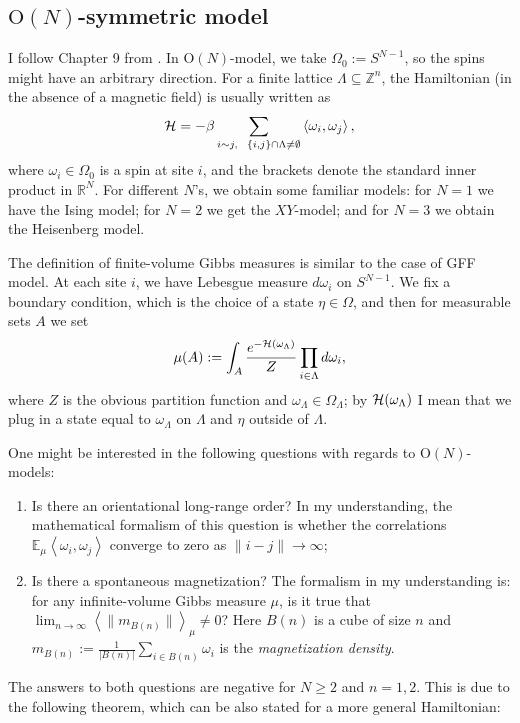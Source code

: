 \subsection{$\text{O}(N)$-symmetric model}
I follow Chapter 9 from \cite{friedli}. In $\text{O}(N)$-model, we take $\Omega_0 := S^{N-1}$, so the spins might have an arbitrary direction. For a finite lattice $\Lambda \subseteq \mathbb Z^n$, the Hamiltonian (in the absence of a magnetic field) is usually written as
\[
\hh = - \beta \sum_{i\sim j, \ \ \{i,j\}\cap \Lambda \neq \emptyset} \left\langle \omega_i,\omega_j \right\rangle,
\]
where $\omega_i \in \Omega_0$ is a spin at site $i$, and the brackets denote the standard inner product in $\mathbb R^N$. For different $N$'s, we obtain some familiar models: for $N=1$ we have the Ising model; for $N=2$ we get the $XY$-model; and for $N=3$ we obtain the Heisenberg model.

The definition of finite-volume Gibbs measures is similar to the case of GFF model. At each site $i$, we have Lebesgue measure $d\omega_i$ on $S^{N-1}$. We fix a boundary condition, which is the choice of a state $\eta \in \Omega$, and then for measurable sets $A$ we set
\[
\mu(A) := \int_A \frac{e^{-\mathcal{H}(\omega_{\Lambda})}}{Z} \prod_{i \in \Lambda} d\omega_i,
\]
where $Z$ is the obvious partition function and $\omega_{\Lambda} \in \Omega_{\Lambda}$; by $\mathcal{H}(\omega_{\Lambda})$ I mean that we plug in a state equal to $\omega_{\Lambda}$ on $\Lambda$ and $\eta$ outside of $\Lambda$.

One might be interested in the following questions with regards to $\text{O}(N)$-models:
\begin{enumerate}[1)]
\item Is there an orientational long-range order? In my understanding, the mathematical formalism of this question is whether the correlations $\mathbb E_{\mu}\left\langle \omega_i, \omega_j \right\rangle$ converge to zero as $\|i-j\| \rightarrow \infty$;
\item Is there a spontaneous magnetization? The formalism in my understanding is: for any infinite-volume Gibbs measure $\mu$, is it true that $\lim_{n \rightarrow \infty} \left\langle \|m_{B(n)}\| \right\rangle_{\mu} \neq 0$? Here $B(n)$ is a cube of size $n$ and $m_{B(n)} := \frac{1}{|B(n)|} \sum_{i \in B(n)} \omega_i$ is the \emph{magnetization density}.

\end{enumerate}
The answers to both questions are negative for $N \geq 2$ and $n=1,2$. This is due to the following theorem, which can be also stated for a more general Hamiltonian:

